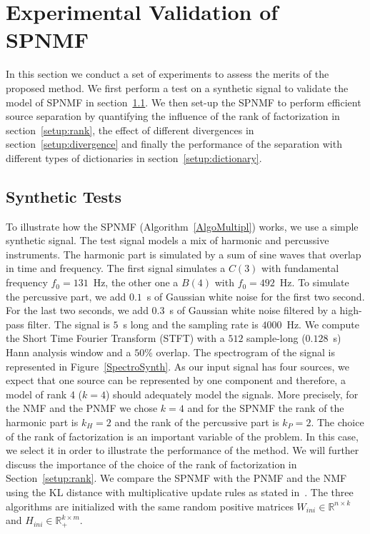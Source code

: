 \section{Experimental Validation of SPNMF}
\label{sec:experiments}

In this section we conduct a set of experiments to assess the merits of the proposed method. We first perform a test on a synthetic signal to validate the model of SPNMF in section~\ref{SynthTest}. We then set-up the SPNMF to perform efficient source separation by quantifying the influence of the rank of factorization in section~\ref{setup:rank}, the effect of different divergences in section~\ref{setup:divergence} and finally the performance of the separation with different types of dictionaries in section~\ref{setup:dictionary}.


\subsection{Synthetic Tests}\label{SynthTest}

To illustrate how the SPNMF (Algorithm~\ref{AlgoMultipl}) works, we use a simple synthetic signal. The test signal models a mix of harmonic and percussive instruments. The harmonic part is simulated by a sum of sine waves that overlap in time and frequency. The first signal simulates a $C(3)$ with fundamental frequency $f_0 = 131$~Hz, the other one a $B(4)$ with $f_0 = 492$~Hz. To simulate the percussive part, we add $0.1$~s of Gaussian white noise for the first two second. For the last two seconds, we add $0.3$~s of Gaussian white noise filtered by a high-pass filter. The signal is $5$~s long and the sampling rate is $4000$~Hz. We compute the Short Time Fourier Transform (STFT) with a $512$ sample-long ($0.128$~s) Hann analysis window and a $50\%$ overlap. The spectrogram of the signal is represented in Figure~\ref{SpectroSynth}. As our input signal has four sources, we expect that one source can be represented by one component and therefore, a model of rank 4 ($k=4$) should adequately model the signals. More precisely, for the NMF and the PNMF we chose $k=4$ and for the SPNMF the rank of the harmonic part is $k_H=2$ and the rank of the percussive part is $k_P=2$. The choice of the rank of factorization is an important variable of the problem. In this case, we select it in order to illustrate the performance of the method. We will further discuss the importance of the choice of the rank of factorization in Section~\ref{setup:rank}. We compare the SPNMF with the PNMF and the NMF using the KL distance with multiplicative update rules as stated in~\cite{fevotte2009nonnegative}. The three algorithms are initialized with the same random positive matrices $W_{ini} \in \mathbb{R}^{n \times k}$  and $ H_{ini} \in \mathbb{R}^{k \times m}_{+} $.

